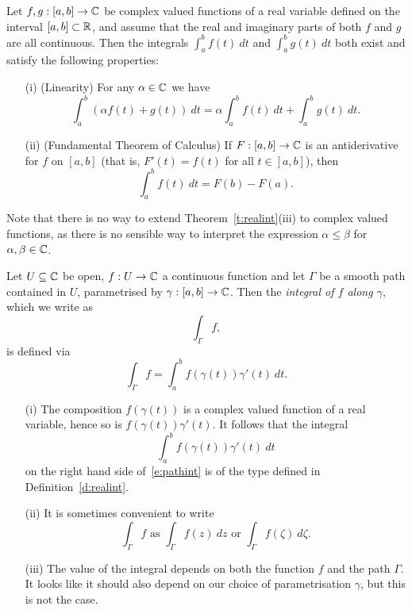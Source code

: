 \begin{theorem}
\label{t:cint1}
Let $f,g:[a,b] \to \mathbb{C}$ be complex valued functions of a real variable defined on the interval $[a,b] \subset \mathbb{R}$, and assume that the real and imaginary parts of both $f$ and $g$ are all continuous.  Then the integrals $\int_a^b f(t)\ dt$ and $\int_a^b g(t)\ dt$ both exist and satisfy the following properties:
\begin{enumerate}
\item[(i)] (Linearity) For any $\alpha \in \mathbb{C}$ we have
\[
\int_a^b \left( \alpha f(t) +  g(t) \right)\ dt = \alpha \int_a^b f(t)\ dt +  \int_a^b g(t)\ dt.
\]
\item[(ii)] (Fundamental Theorem of Calculus) If $F:[a,b] \to \mathbb{C}$ is an antiderivative for $f$ on $[a,b]$ (that is, $F'(t) = f(t)$ for all $t \in [a,b]$), then 
\[
\int_a^b f(t)\ dt = F(b) - F(a).
\]
\end{enumerate}
\end{theorem}
Note that there is no way to extend Theorem~\ref{t:realint}(iii) to complex valued functions, as there is no sensible way to interpret the expression $\alpha \leq \beta $ for $\alpha, \beta \in \mathbb{C}$.


\begin{definition}
Let $U \subseteq \mathbb{C}$ be open, $f:U \to \mathbb{C}$ a continuous function and let $\Gamma$ be a smooth path contained in $U$, parametrised by $\gamma :[a,b] \to \mathbb{C}$.  Then the \emph{integral of $f$ along $\gamma$}, which we write as 
\[
\int_{\Gamma} f,
\]
is defined via
\begin{equation}
\label{e:pathint}
\int_{\Gamma} f = \int_a^b f \left( \gamma(t) \right) \gamma ' (t)\ dt.
\end{equation}
\end{definition}

\begin{note}
\begin{enumerate}
\item[(i)] The composition $f \left( \gamma (t) \right)$ is a complex valued function of a real variable, hence so is $f \left( \gamma (t) \right) \gamma '(t)$.  It follows that the integral
\[
\int_a^b f \left( \gamma(t) \right) \gamma ' (t)\ dt
\]
on the right hand side of~\eqref{e:pathint} is of the type defined in Definition~\ref{d:realint}.
\item[(ii)] It is sometimes convenient to write
\[
\int_{\Gamma} f \text{ as } \int_{\Gamma} f(z)\ dz \text{ or } \int_{\Gamma} f ( \zeta ) \ d \zeta.
\]
\item[(iii)] The value of the integral depends on both the function $f$ and the path $\Gamma$.  It looks like it should also depend on our choice of parametrisation $\gamma$, but this is not the case.
\end{enumerate}
\end{note}


